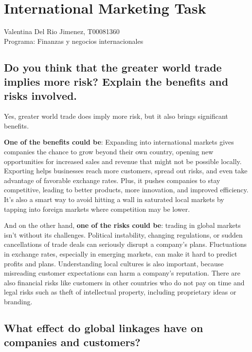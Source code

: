 \documentclass[letterpaper, 12pt]{report}
\begin{document}
\chapter*{International Marketing Task}

\noindent\makebox[\linewidth]{\rule{\textwidth}{0.4pt}}

\noindent
Valentina Del Rio Jimenez, T00081360 \\
Programa: Finanzas y negocios internacionales

\noindent\makebox[\linewidth]{\rule{\textwidth}{0.4pt}}

\nocite{*}

\section{Do you think that the greater world trade implies more risk? Explain the benefits and risks involved.}

Yes, greater world trade does imply more risk, but it also brings significant
benefits.

\textbf{One of the benefits could be}: Expanding into international markets gives companies the chance to grow beyond their own country, opening new opportunities for increased sales and revenue that might not be possible locally. Exporting helps businesses reach more customers, spread out risks, and even take advantage of favorable exchange rates. Plus, it pushes companies to stay competitive, leading to better products, more innovation, and improved efficiency. It’s also a smart way to avoid hitting a wall in saturated local markets by tapping into foreign markets where competition may be lower.

And on the other hand, \textbf{one of the risks could be}: trading in global
markets isn’t without its challenges. Political instability, changing
regulations, or sudden cancellations of trade deals can seriously disrupt a
company’s plans. Fluctuations in exchange rates, especially in emerging
markets, can make it hard to predict profits and plans. Understanding local
cultures is also important, because misreading customer expectations can harm a
company's reputation. There are also financial risks like customers in other
countries who do not pay on time and legal risks such as theft of intellectual
property, including proprietary ideas or branding.

\section{What effect do global linkages have on companies and customers?}
\end{document}
